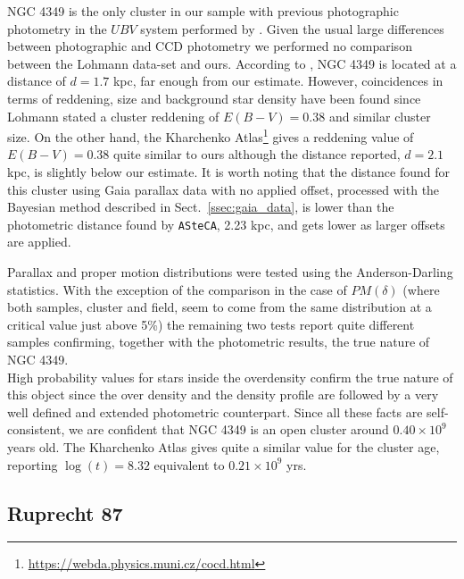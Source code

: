 \documentclass[draft]{aa}
\begin{document}
NGC 4349 is the only cluster in our sample with previous photographic photometry
in the $UBV$ system performed by \cite{Lohmann_1961}. Given the usual large
differences between photographic and CCD photometry we performed no comparison
between the Lohmann data-set and ours. According to \cite{Lohmann_1961}, NGC
4349 is located at a distance of $d=1.7$ kpc, far enough from our estimate.
However, coincidences in terms of reddening, size and background star density
have been found since Lohmann stated a cluster reddening of $E(B-V)=0.38$
and similar cluster size. On the other hand, the Kharchenko
Atlas\footnote{\url{https://webda.physics.muni.cz/cocd.html}}
\citep{Kharchenko_2005} gives a reddening value of $E(B-V) = 0.38$ quite
similar to ours although the distance reported, $d=2.1$ kpc, is slightly below
our estimate.
It is worth noting that the distance found for this cluster using Gaia
parallax data with no applied offset, processed with the Bayesian method
described in Sect.~\ref{ssec:gaia_data}, is lower than the photometric
distance found by \texttt{ASteCA}, 2.23 kpc, and gets lower as larger offsets
are applied.

Parallax and proper motion distributions were tested using the Anderson-Darling
statistics. With the exception of the comparison in the case of $PM(\delta)$
(where both samples, cluster and field, seem to come from the same distribution
at a critical value just above 5\%) the remaining two tests report quite
different samples confirming, together with the photometric results, the true
nature of NGC 4349.\\

High probability values for stars inside the overdensity confirm the
true nature of this object since the over density and the density profile
are followed by a very well defined and extended photometric counterpart.
Since all these facts are self-consistent, we are confident that NGC 4349 is
an open cluster around $0.40\times10^9$ years old.
The Kharchenko Atlas gives quite a similar value for the cluster age, reporting
$\log(t)=8.32$ equivalent to $0.21\times10^9$ yrs.



\subsection{Ruprecht 87}
\end{document}
